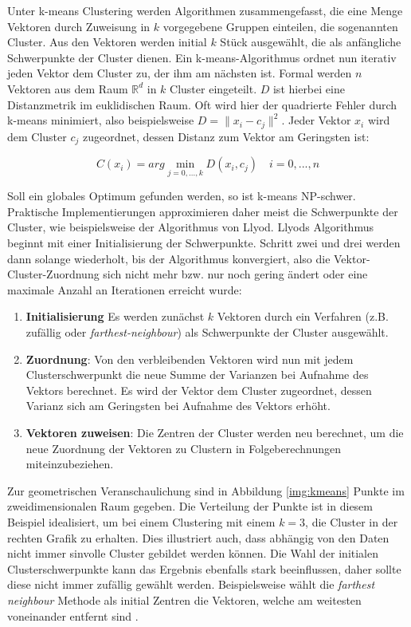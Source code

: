 Unter k-means Clustering werden Algorithmen zusammengefasst, die eine Menge Vektoren durch Zuweisung in $k$ vorgegebene Gruppen einteilen, die sogenannten Cluster. Aus den Vektoren werden initial $k$ Stück ausgewählt, die als anfängliche Schwerpunkte der Cluster dienen. Ein k-means-Algorithmus ordnet nun iterativ jeden Vektor dem Cluster zu, der ihm am nächsten ist. Formal werden $n$ Vektoren aus dem Raum $\mathbb{R}^{d}$ in $k$ Cluster eingeteilt. $D$ ist hierbei eine Distanzmetrik im euklidischen Raum. Oft wird hier der quadrierte Fehler durch k-means minimiert, also beispielsweise $D = \|x_{i} - c_{j}\|^{2}$. Jeder Vektor $x_{i}$ wird dem Cluster $c_{j}$ zugeordnet, dessen Distanz zum Vektor am Geringsten ist:

$$ C(x_i) = arg \min_{j = 0,...,k} D(x_i, c_j) \quad i = 0,...,n$$

Soll ein globales Optimum gefunden werden, so ist k-means NP-schwer. Praktische Implementierungen approximieren daher meist die Schwerpunkte der Cluster, wie beispielsweise der Algorithmus von Llyod. Llyods Algorithmus beginnt mit einer Initialisierung der Schwerpunkte. Schritt zwei und drei werden dann solange wiederholt, bis der Algorithmus konvergiert, also die Vektor-Cluster-Zuordnung sich nicht mehr bzw. nur noch gering ändert oder eine maximale Anzahl an Iterationen erreicht wurde: 

\begin{enumerate}
	\item \textbf{Initialisierung} Es werden zunächst $k$ Vektoren durch ein Verfahren (z.B. zufällig oder \textit{farthest-neighbour}) als Schwerpunkte der Cluster ausgewählt.
	\item \textbf{Zuordnung}: Von den verbleibenden Vektoren wird nun mit jedem Clusterschwerpunkt die neue Summe der Varianzen bei Aufnahme des Vektors berechnet. Es wird der Vektor dem Cluster zugeordnet, dessen Varianz sich am Geringsten bei Aufnahme des Vektors erhöht.
	\item \textbf{Vektoren zuweisen}: Die Zentren der Cluster werden neu berechnet, um die neue Zuordnung der Vektoren zu Clustern in Folgeberechnungen miteinzubeziehen.
\end{enumerate}

Zur geometrischen Veranschaulichung sind in Abbildung \ref{img:kmeans} Punkte im zweidimensionalen Raum gegeben. Die Verteilung der Punkte ist in diesem Beispiel idealisiert, um bei einem Clustering mit einem $k = 3$, die Cluster in der rechten Grafik zu erhalten. Dies illustriert auch, dass abhängig von den Daten nicht immer sinvolle Cluster gebildet werden können. Die Wahl der initialen Clusterschwerpunkte kann das Ergebnis ebenfalls stark beeinflussen, daher sollte diese nicht immer zufällig gewählt werden. Beispielsweise wählt die \textit{farthest neighbour} Methode als initial Zentren die Vektoren, welche am weitesten voneinander entfernt sind \cite{mmd2011}.


